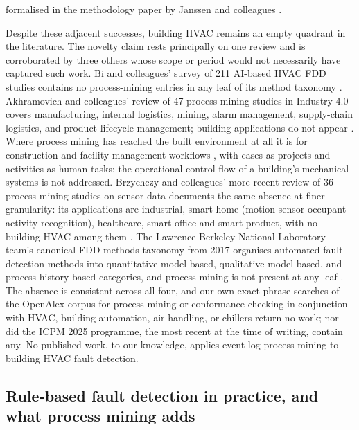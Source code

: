 \documentclass[11pt,letterpaper]{article}
\begin{document}
formalised in the methodology paper by Janssen and colleagues \cite{janssen2021sensoreventlog}.

Despite these adjacent successes, building HVAC remains an empty quadrant in the literature. The novelty claim rests principally on one review and is corroborated by three others whose scope or period would not necessarily have captured such work. Bi and colleagues' survey of 211 AI-based HVAC FDD studies contains no process-mining entries in any leaf of its method taxonomy \cite{bi2024aihvacreview}. Akhramovich and colleagues' review of 47 process-mining studies in Industry 4.0 covers manufacturing, internal logistics, mining, alarm management, supply-chain logistics, and product lifecycle management; building applications do not appear \cite{akhramovich2024pmindustry40}. Where process mining has reached the built environment at all it is for construction and facility-management workflows \cite{martinezlagunas2024constructionpm}, with cases as projects and activities as human tasks; the operational control flow of a building's mechanical systems is not addressed. Brzychczy and colleagues' more recent review of 36 process-mining studies on sensor data documents the same absence at finer granularity: its applications are industrial, smart-home (motion-sensor occupant-activity recognition), healthcare, smart-office and smart-product, with no building HVAC among them \cite{brzychczy2025pmsensorreview}. The Lawrence Berkeley National Laboratory team's canonical FDD-methods taxonomy from 2017 organises automated fault-detection methods into quantitative model-based, qualitative model-based, and process-history-based categories, and process mining is not present at any leaf \cite{granderson2017fddtoolsurvey}. The absence is consistent across all four, and our own exact-phrase searches of the OpenAlex corpus \cite{priem2022openalex} for process mining or conformance checking in conjunction with HVAC, building automation, air handling, or chillers return no work; nor did the ICPM 2025 programme, the most recent at the time of writing, contain any. No published work, to our knowledge, applies event-log process mining to building HVAC fault detection.

\subsection{Rule-based fault detection in practice, and what process mining adds}
\end{document}
